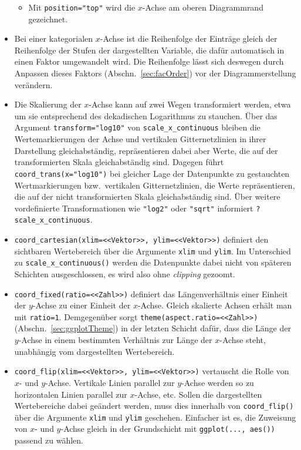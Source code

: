 \begin{itemize}
\begin{itemize}
\item Mit \lstinline!position="top"! wird die $x$-Achse am oberen Diagrammrand gezeichnet.
\end{itemize}
\item Bei einer kategorialen $x$-Achse ist die Reihenfolge der Einträge gleich der Reihenfolge der Stufen der dargestellten Variable, die dafür automatisch in einen Faktor umgewandelt wird. Die Reihenfolge lässt sich deswegen durch Anpassen dieses Faktors (Abschn.\ \ref{sec:facOrder}) vor der Diagrammerstellung verändern.
\item Die Skalierung der $x$-Achse kann auf zwei Wegen transformiert werden, etwa um sie entsprechend des dekadischen Logarithmus zu stauchen. Über das Argument \lstinline!transform="log10"! von \lstinline!scale_x_continuous! bleiben die Wertemarkierungen der Achse und vertikalen Gitternetzlinien in ihrer Darstellung gleichabständig, repräsentieren dabei aber Werte, die auf der transformierten Skala gleichabständig sind. Dagegen führt \lstinline!coord_trans(x="log10")! bei gleicher Lage der Datenpunkte zu gestauchten Wertmarkierungen bzw.\ vertikalen Gitternetzlinien, die Werte repräsentieren, die auf der nicht transformierten Skala gleichabständig sind. Über weitere vordefinierte Transformationen wie \lstinline!"log2"! oder \lstinline!"sqrt"! informiert \lstinline!?scale_x_continuous!.
\item {} \lstinline!coord_cartesian(xlim=<<Vektor>>, ylim=<<Vektor>>)! definiert den sichtbaren Wertebereich über die Argumente \lstinline!xlim! und \lstinline!ylim!. Im Unterschied zu \lstinline!scale_x_continuous()! werden die Datenpunkte dabei nicht von späteren Schichten ausgeschlossen, es wird also ohne \emph{clipping} gezoomt.
\item {} \lstinline!coord_fixed(ratio=<<Zahl>>)! definiert das Längenverhältnis einer Einheit der $y$-Achse zu einer Einheit der $x$-Achse. Gleich skalierte Achsen erhält man mit \lstinline!ratio=1!. Demgegenüber sorgt \lstinline!theme(aspect.ratio=<<Zahl>>)! (Abschn.\ \ref{sec:ggplotTheme}) in der letzten Schicht dafür, dass die Länge der $y$-Achse in einem bestimmten Verhältnis zur Länge der $x$-Achse steht, unabhängig vom dargestellten Wertebereich.
\item {} \lstinline!coord_flip(xlim=<<Vektor>>, ylim=<<Vektor>>)! vertauscht die Rolle von $x$- und $y$-Achse. Vertikale Linien parallel zur $y$-Achse werden so zu horizontalen Linien parallel zur $x$-Achse, etc. Sollen die dargestellten Wertebereiche dabei geändert werden, muss dies innerhalb von \lstinline!coord_flip()! über die Argumente \lstinline!xlim! und \lstinline!ylim! geschehen. Einfacher ist es, die Zuweisung von $x$- und $y$-Achse gleich in der Grundschicht mit \lstinline!ggplot(..., aes())! passend zu wählen.
\end{itemize}


